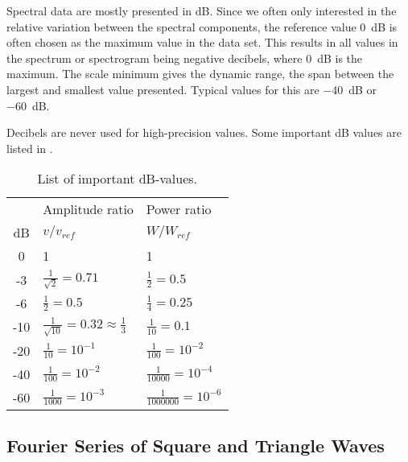 Spectral data are mostly presented in \unit{dB}. Since we often only interested in the relative variation between the spectral components, the reference value \qty{0}{dB} is often chosen as the maximum value in the data set. 
This results in all values in the spectrum or spectrogram being negative decibels, where \qty{0}{dB} is the maximum. The scale minimum gives the dynamic range, the span between the largest and smallest value presented. Typical values for this are \qty{-40}{dB} or \qty{-60}{dB}.

Decibels are never used for high-precision values.
Some important \unit{dB} values are listed in .

\begin{table}[ht!]
	\caption{List of important \unit{dB}-values. }
	\label{tab:db-scale}
\begin{center}
\def\rspace{0.5em}
\begin{tabular}{cll}
	 	&	Amplitude ratio	& Power ratio \\ [\rspace]
	dB	&	$v/v_{ref}$	& $W/W_{ref}$	\\ [\rspace]
	\hline
	0	&	1				&	1			\\ [\rspace]
	-3	&	$\frac{1}{\sqrt{2}}= 0.71$	&	$\frac12 = 0.5$	\\  [\rspace]
	-6	&	$\frac12 = 0.5$			&	$\frac14 = 0.25$	\\	 [\rspace]
	-10	&	$\frac{1}{\sqrt{10}} = 0.32 \approx \frac{1}{3}$	&	$\frac{1}{10} = 0.1$	\\  [\rspace]
	-20	&	$\frac{1}{10} = 10^{-1} $			&	$\frac{1}{100} = 10^{-2}$	\\  [\rspace]
	-40	&	$\frac{1}{100} = 10^{-2} $			&	$\frac{1}{10 000} = 10^{-4}$	\\  [\rspace]
	-60	&	$\frac{1}{1000} = 10^{-3} $			&	$\frac{1}{1 000 000} = 10^{-6}$	\\  [\rspace]
	\hline
	
\end{tabular}
\end{center}	
\end{table}

\subsection{Fourier Series of Square and Triangle Waves}

